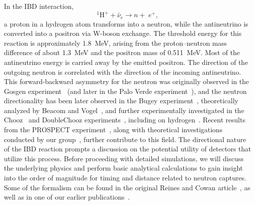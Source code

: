 \documentclass[tightenlines,
twocolumn,prl,notitlepage,nofootinbib,preprintnumbers,longbibliography]{revtex4-1}
\begin{document}
In the IBD interaction,
\[
^1\mathrm{H}^+ + \bar\nu_e \to n + \;e^+,
\]
a proton in a hydrogen atom transforms into a neutron, while the antineutrino is converted into a positron via W-boson exchange. The threshold energy for this reaction is approximately 1.8~MeV, arising from the proton–neutron mass difference of about 1.3~MeV and the positron mass of 0.511~MeV. Most of the antineutrino energy is carried away by the emitted positron.
The direction of the outgoing neutron is correlated with the direction of the incoming antineutrino. This forward-backward asymmetry for the neutron was originally observed in the Gosgen experiment~\cite{Zacek:1984qi} (and later in the Palo Verde experiment~\cite{PaloVerde_direction}), and the neutron directionality has been later observed in the Bugey experiment~\cite{Cussonneau:1992lua}, theoretically analyzed by Beacom and Vogel~\cite{PhysRevD.60.053003}, and further experimentally investigated in the Chooz~\cite{CHOOZ:1999hgz} and DoubleChooz experiments~\cite{Caden:2012bm}, including on hydrogen~\cite{Roncin:2014adw}. Recent results from the PROSPECT experiment~\cite{PhysRevD.111.032014}, along with theoretical investigations conducted by our group~\cite{Duvall:2024cae}, further contribute to this field.
The directional nature of the IBD reaction prompts a discussion on the potential utility of detectors that utilize this process. Before proceeding with detailed simulations, we will discuss the underlying physics and perform basic analytical calculations to gain insight into the order of magnitude for timing and distance related to neutron captures. Some of the formalism can be found in the original Reines and Cowan article~\cite{Reines_RevSciIns1954}, as well as in one of our earlier publications~\cite{mTC:2016yys}.

\end{document}
